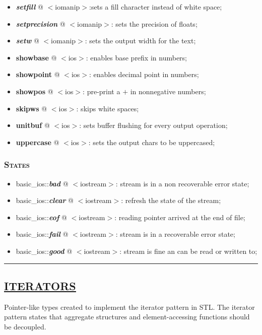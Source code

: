 \documentclass[10pt]{article}
\begin{document}
\begin{multicols*}{5}
{\begin{itemize}[leftmargin=*,topsep=0.25pt]
	\item \emph{\textbf{setfill}} @ $<$iomanip$>$:sets a fill character instead of white space; 
	\item \emph{\textbf{setprecision}} @ $<$iomanip$>$: sets the precision of floats; 
	\item \emph{\textbf{setw}} @ $<$iomanip$>$: sets the output width for the text; 
	\item \textbf{showbase} @ $<$ios$>$: enables base prefix in numbers;
	\item \textbf{showpoint} @ $<$ios$>$: enables decimal point in numbers;
	\item \textbf{showpos} @ $<$ios$>$: pre-print a $+$ in nonnegative numbers;
	\item \textbf{skipws} @ $<$ios$>$: skips white spaces;
	\item \textbf{unitbuf} @ $<$ios$>$: sets buffer flushing for every output operation;
	\item \textbf{uppercase} @ $<$ios$>$: sets the output chars to be uppercased;
\end{itemize}

\subsubsection*{\textsc{States}} 
\begin{itemize}[leftmargin=*,topsep=0.25pt]
  \setlength\itemsep{-1.8pt}
	\item basic\_ios::\emph{\textbf{bad}} @ $<$iostream$>$: stream is in a non recoverable error state;
	\item basic\_ios::\emph{\textbf{clear}} @ $<$iostream$>$: refresh the state of the stream;
	\item basic\_ios::\emph{\textbf{eof}} @ $<$iostream$>$: reading pointer arrived at the end of file;
	\item basic\_ios::\emph{\textbf{fail}} @ $<$iostream$>$: stream is in a recoverable error state;
	\item basic\_ios::\emph{\textbf{good}} @ $<$iostream$>$: stream is fine an can be read or written to;
\end{itemize}


}

\par\noindent\rule{155pt}{0.4pt}

{\color{Blue}
\subsection*{\href{https://en.cppreference.com/w/cpp/iterator}{\underline{ITERATORS}}}	
\noindent
Pointer-like types created to implement the iterator pattern in STL. The iterator pattern states that aggregate structures and element-accessing functions should be decoupled.

}
\end{multicols*}
\end{document}

